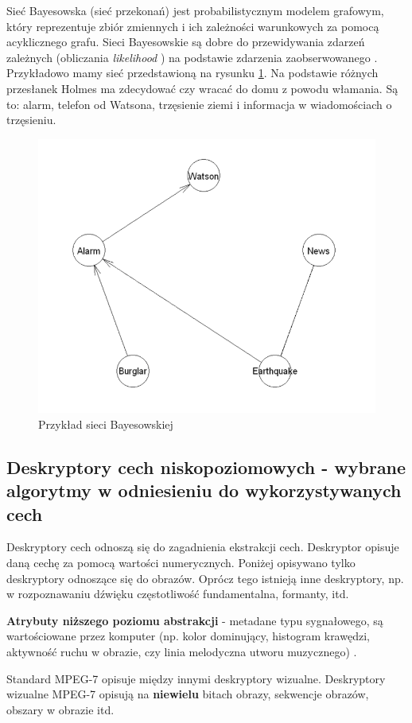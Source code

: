 \documentclass[wi]{zut}
\begin{document}
Sieć Bayesowska (sieć przekonań) jest probabilistycznym modelem grafowym, który reprezentuje zbiór zmiennych i ich zależności warunkowych za pomocą acyklicznego grafu. Sieci Bayesowskie są dobre do przewidywania zdarzeń zależnych (obliczania \emph{likelihood} \cite{wiki:Likelihood_function}) na podstawie zdarzenia zaobserwowanego 
\cite{wiki:Bayesian_network}. Przykładowo mamy sieć przedstawioną na rysunku \ref{fig:bayesian}. Na podstawie różnych przesłanek Holmes ma zdecydować czy wracać do domu z powodu włamania. Są to: alarm, telefon od Watsona, trzęsienie ziemi i informacja w wiadomościach o trzęsieniu.


\begin{figure}[H]
    \centering
    \includegraphics[width=0.5\linewidth]{images/bayesian.png}
    \caption{Przykład sieci Bayesowskiej}
    \label{fig:bayesian}
\end{figure}


\subsection{Deskryptory cech niskopoziomowych - wybrane algorytmy w odniesieniu do wykorzystywanych cech}

Deskryptory cech odnoszą się do zagadnienia ekstrakcji cech. Deskryptor opisuje daną cechę za pomocą wartości numerycznych. Poniżej opisywano tylko deskryptory odnoszące się do obrazów. Oprócz tego istnieją inne deskryptory, np. w rozpoznawaniu dźwięku częstotliwość fundamentalna, formanty, itd.

\textbf{Atrybuty niższego poziomu abstrakcji} - metadane typu sygnałowego, są wartościowane przez komputer (np. kolor dominujący, histogram krawędzi, aktywność ruchu w obrazie, czy linia melodyczna utworu muzycznego) \cite{Frejlichowski2020}.

Standard MPEG-7 opisuje między innymi deskryptory wizualne. Deskryptory wizualne MPEG-7 opisują na \textbf{niewielu} bitach obrazy, sekwencje obrazów, obszary w obrazie itd. 
\end{document}
